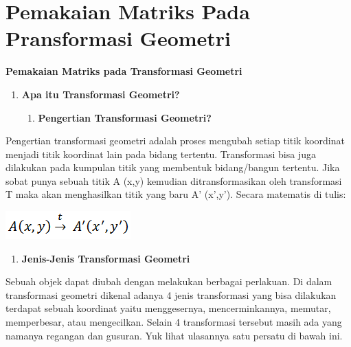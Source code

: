 \documentclass[11pt,fleqn]{book} %
\begin{document}
\section{Pemakaian Matriks Pada Pransformasi Geometri}

\begin{center}
\LARGE \textbf{Pemakaian Matriks pada Transformasi Geometri}
\end{center}

\begin{enumerate}
\item \textbf{Apa itu Transformasi Geometri?}

\begin{enumerate}
\item \textbf{ Pengertian Transformasi Geometri?}
\end{enumerate}
\end{enumerate}

\noindent 
 Pengertian transformasi geometri adalah proses mengubah setiap titik koordinat menjadi titik koordinat lain pada bidang tertentu. Transformasi bisa juga dilakukan pada kumpulan titik yang membentuk bidang/bangun tertentu. Jika sobat punya sebuah titik A (x,y) kemudian ditransformasikan oleh transformasi T maka akan menghasilkan titik yang baru A’ (x’,y’). Secara matematis di tulis:

\noindent 
\noindent 
\noindent 
\begin{center}
\includegraphics{Pictures/1.PNG}\\
\end{center}

\begin{enumerate}
	\item \textbf{Jenis-Jenis Transformasi Geometri}
\end{enumerate}

\noindent 
Sebuah objek dapat diubah dengan melakukan berbagai perlakuan. Di dalam transformasi geometri dikenal adanya 4 jenis transformasi yang bisa dilakukan terdapat sebuah koordinat yaitu menggesernya, mencerminkannya, memutar, memperbesar, atau mengecilkan. Selain 4 transformasi tersebut masih ada yang namanya regangan dan gusuran. Yuk lihat ulasannya satu persatu di bawah ini.
\end{document}
